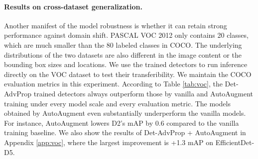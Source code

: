 \documentclass[final]{cvpr}
\begin{document}
\begin{table}[!htb]
\centering
{}
\smallskip
\caption{Comparison of augmentation strategies and vanilla training on COCO-C~\cite{michaelis2020benchmarking}. 
Det-AdvProp can double the improvement achieved by AutoAugment~\cite{zoph2019learning}.}
\label{tab:coco-c}
\vspace{-10pt}
\end{table}

\vspace{-10pt}

\paragraph{Results on cross-dataset generalization.}
Another manifest of the model robustness is whether it can retain strong performance against domain shift.
PASCAL VOC 2012 \cite{pascal-voc-2012} only contains 20 classes, which are much smaller than the 80 labeled classes in COCO. 
The underlying distributions of the two datasets are also different in the image content or the bounding box sizes and locations.
We use the trained detectors to run inference directly on the VOC dataset to test their transferibility. We maintain the COCO evaluation metrics in this experiment.
According to Table \ref{tab:voc}, the Det-AdvProp trained detectors always outperform those by vanilla and AutoAugment training under every model scale and every evaluation metric.
The models obtained by AutoAugment even substantially underperform the vanilla models.
For instance, AutoAugment lowers D2's mAP by 0.6 compared to the vanilla training baseline.
We also show the results of Det-AdvProp + AutoAugment in Appendix \ref{app:voc}, where the largest improvement is +1.3 mAP on EfficientDet-D5.
\end{document}
